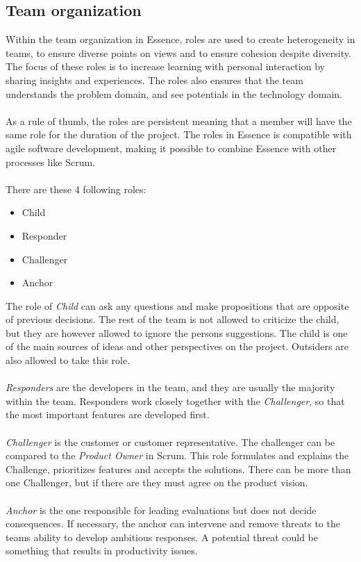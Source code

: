 \subsection{Team organization}
Within the team organization in Essence, roles are used to create heterogeneity in teams, to ensure diverse points on views and to ensure cohesion despite diversity.
The focus of these roles is to increase learning with personal interaction by sharing insights and experiences.
The roles also ensures that the team understands the problem domain, and see potentials in the technology domain.
\\\\
As a rule of thumb, the roles are  persistent meaning that a member will have the same role for the duration of the project.
The roles in Essence is compatible with agile software development, making it possible to combine Essence with other processes like Scrum.
\\\\
There are these 4 following roles:
\begin{itemize}
    \item Child
    \item Responder
    \item Challenger
    \item Anchor
\end{itemize}
The role of \textit{Child} can ask any questions and make propositions that are opposite of previous decisions.
The rest of the team is not allowed to criticize the child, but they are however allowed to ignore the persons suggestions.
The child is one of the main sources of ideas and other perspectives on the project.
Outsiders are also allowed to take this role.
\\\\
\textit{Responders} are the developers in the team, and they are usually the majority within the team.
Responders work closely together with the \textit{Challenger}, so that the most important features are developed first.
\\\\
\textit{Challenger} is the customer or customer representative. 
The challenger can be compared to the \textit{Product Owner} in Scrum.
This role formulates and explains the Challenge, prioritizes features and accepts the solutions.
There can be more than one Challenger, but if there are they must agree on the product vision.
\\\\
\textit{Anchor} is the one responsible for leading evaluations but does not decide consequences.
If necessary, the anchor can intervene and remove threats to the teams ability to develop ambitious responses. 
A potential threat could be something that results in productivity issues.
